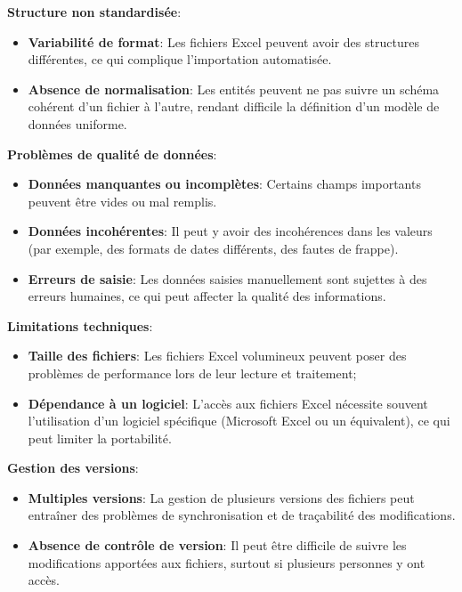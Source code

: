 \noindent \textbf{Structure non standardisée}:
\begin{itemize}
    \item \textbf{Variabilité de format}: Les fichiers Excel peuvent avoir des structures différentes, ce qui complique l'importation automatisée.
    \item \textbf{Absence de normalisation}: Les entités peuvent ne pas suivre un schéma cohérent d'un fichier à l'autre, rendant difficile la définition d'un modèle de données uniforme.
\end{itemize}
\vspace{.4cm}
\noindent \textbf{Problèmes de qualité de données}:
\begin{itemize}
    \item \textbf{Données manquantes ou incomplètes}: Certains champs importants peuvent être vides ou mal remplis.
    \item \textbf{Données incohérentes}: Il peut y avoir des incohérences dans les valeurs (par exemple, des formats de dates différents, des fautes de frappe).
    \item \textbf{Erreurs de saisie}: Les données saisies manuellement sont sujettes à des erreurs humaines, ce qui peut affecter la qualité des informations.
\end{itemize}
\vspace{.4cm}

\noindent \textbf{Limitations techniques}:
\begin{itemize}
    \item \textbf{Taille des fichiers}: Les fichiers Excel volumineux peuvent poser des problèmes de performance lors de leur lecture et traitement;
    \item \textbf{Dépendance à un logiciel}: L'accès aux fichiers Excel nécessite souvent l'utilisation d'un logiciel spécifique (Microsoft Excel ou un équivalent), ce qui peut limiter la portabilité.
\end{itemize}
\vspace{.4cm}

\noindent \textbf{Gestion des versions}:
\begin{itemize}
    \item \textbf{Multiples versions}: La gestion de plusieurs versions des fichiers peut entraîner des problèmes de synchronisation et de traçabilité des modifications.
    \item \textbf{Absence de contrôle de version}: Il peut être difficile de suivre les modifications apportées aux fichiers, surtout si plusieurs personnes y ont accès.
\end{itemize}
\vspace{.4cm}

